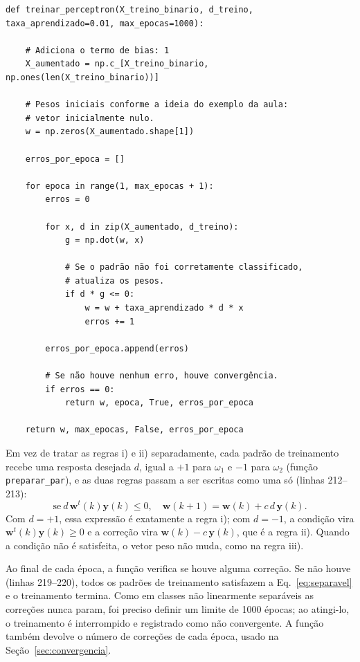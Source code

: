 \documentclass[12pt,a4paper]{article}
\begin{document}
\begin{lstlisting}[firstnumber=193,title=\texttt{pr4\_perceptron\_iris\_colab.py}]
def treinar_perceptron(X_treino_binario, d_treino, taxa_aprendizado=0.01, max_epocas=1000):

    # Adiciona o termo de bias: 1
    X_aumentado = np.c_[X_treino_binario, np.ones(len(X_treino_binario))]

    # Pesos iniciais conforme a ideia do exemplo da aula:
    # vetor inicialmente nulo.
    w = np.zeros(X_aumentado.shape[1])

    erros_por_epoca = []

    for epoca in range(1, max_epocas + 1):
        erros = 0

        for x, d in zip(X_aumentado, d_treino):
            g = np.dot(w, x)

            # Se o padrão não foi corretamente classificado,
            # atualiza os pesos.
            if d * g <= 0:
                w = w + taxa_aprendizado * d * x
                erros += 1

        erros_por_epoca.append(erros)

        # Se não houve nenhum erro, houve convergência.
        if erros == 0:
            return w, epoca, True, erros_por_epoca

    return w, max_epocas, False, erros_por_epoca
\end{lstlisting}

Em vez de tratar as regras i) e ii) separadamente, cada padrão de treinamento recebe uma resposta desejada $d$, igual a $+1$ para $\omega_1$ e $-1$ para $\omega_2$ (função \texttt{preparar\_par}), e as duas regras passam a ser escritas como uma só (linhas 212--213):
\[
  \text{se}\ d\,\mathbf{w}^t(k)\mathbf{y}(k) \leq 0, \quad \mathbf{w}(k+1) = \mathbf{w}(k) + c\,d\,\mathbf{y}(k).
\]
Com $d = +1$, essa expressão é exatamente a regra i); com $d = -1$, a condição vira $\mathbf{w}^t(k)\mathbf{y}(k) \geq 0$ e a correção vira $\mathbf{w}(k) - c\,\mathbf{y}(k)$, que é a regra ii). Quando a condição não é satisfeita, o vetor peso não muda, como na regra iii).

Ao final de cada época, a função verifica se houve alguma correção. Se não houve (linhas 219--220), todos os padrões de treinamento satisfazem a Eq.~\eqref{eq:separavel} e o treinamento termina. Como em classes não linearmente separáveis as correções nunca param, foi preciso definir um limite de 1000 épocas; ao atingi-lo, o treinamento é interrompido e registrado como não convergente. A função também devolve o número de correções de cada época, usado na Seção~\ref{sec:convergencia}.
\end{document}
